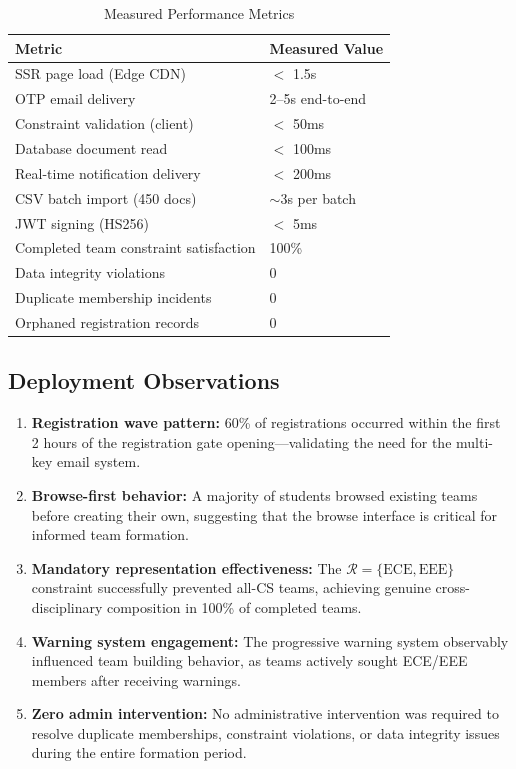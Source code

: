 \documentclass[12pt,a4paper]{article}
\begin{document}
\begin{table}[H]
\centering
\caption{Measured Performance Metrics}
\begin{tabular}{@{}ll@{}}
\toprule
\textbf{Metric} & \textbf{Measured Value} \\
\midrule
SSR page load (Edge CDN) & $<$ 1.5s \\
OTP email delivery & 2--5s end-to-end \\
Constraint validation (client) & $<$ 50ms \\
Database document read & $<$ 100ms \\
Real-time notification delivery & $<$ 200ms \\
CSV batch import (450 docs) & $\sim$3s per batch \\
JWT signing (HS256) & $<$ 5ms \\
Completed team constraint satisfaction & 100\% \\
Data integrity violations & 0 \\
Duplicate membership incidents & 0 \\
Orphaned registration records & 0 \\
\bottomrule
\end{tabular}
\end{table}

\subsection{Deployment Observations}

\begin{enumerate}[noitemsep,topsep=3pt]
    \item \textbf{Registration wave pattern:} 60\% of registrations occurred within the first 2 hours of the registration gate opening---validating the need for the multi-key email system.
    \item \textbf{Browse-first behavior:} A majority of students browsed existing teams before creating their own, suggesting that the browse interface is critical for informed team formation.
    \item \textbf{Mandatory representation effectiveness:} The $\mathcal{R} = \{\text{ECE}, \text{EEE}\}$ constraint successfully prevented all-CS teams, achieving genuine cross-disciplinary composition in 100\% of completed teams.
    \item \textbf{Warning system engagement:} The progressive warning system observably influenced team building behavior, as teams actively sought ECE/EEE members after receiving warnings.
    \item \textbf{Zero admin intervention:} No administrative intervention was required to resolve duplicate memberships, constraint violations, or data integrity issues during the entire formation period.
\end{enumerate}
\end{document}
